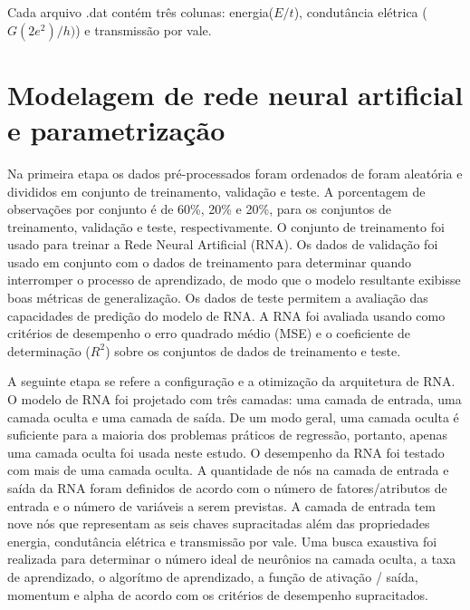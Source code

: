 Cada arquivo .dat contém três colunas: energia($E/t$), condutância elétrica ($G(2e^2)/h)$) e transmissão por vale.






\section{Modelagem de rede neural artificial e parametrização}
Na primeira etapa os dados pré-processados foram ordenados de foram aleatória e divididos em conjunto de treinamento, validação e teste. A porcentagem de observações por conjunto é de 60\%, 20\% e 20\%, para os conjuntos de treinamento, validação e teste, respectivamente. O conjunto de treinamento foi usado para treinar a Rede Neural Artificial (RNA). Os  dados de validação foi usado em conjunto com o dados de treinamento para determinar quando interromper o processo de aprendizado, de modo que o modelo resultante exibisse boas métricas de generalização. Os dados de teste permitem a avaliação das capacidades de predição do modelo de RNA. A RNA foi avaliada usando como
critérios de desempenho o erro quadrado médio (MSE) e o coeficiente de determinação ($R^2$) sobre os conjuntos de dados de treinamento e teste.


A seguinte etapa se refere a configuração e a otimização da arquitetura de RNA. O modelo de RNA foi projetado com três camadas: uma camada de entrada, uma
camada oculta e uma camada de saída. De um modo geral, uma camada oculta é suficiente para a maioria dos problemas práticos de regressão, portanto, apenas uma camada oculta foi usada neste estudo. O desempenho da RNA foi testado com mais de uma camada oculta.
A quantidade de nós na camada de entrada e saída da RNA foram definidos de acordo com o número de fatores/atributos de entrada e o número de variáveis a serem previstas. A camada de entrada tem nove nós que representam as seis chaves supracitadas além das propriedades energia, condutância elétrica e transmissão por vale. Uma busca exaustiva foi realizada para determinar o número ideal de neurônios na camada oculta, a taxa de aprendizado, o algorítmo de aprendizado, a função de ativação / saída, momentum e alpha de acordo com os critérios de desempenho supracitados.

